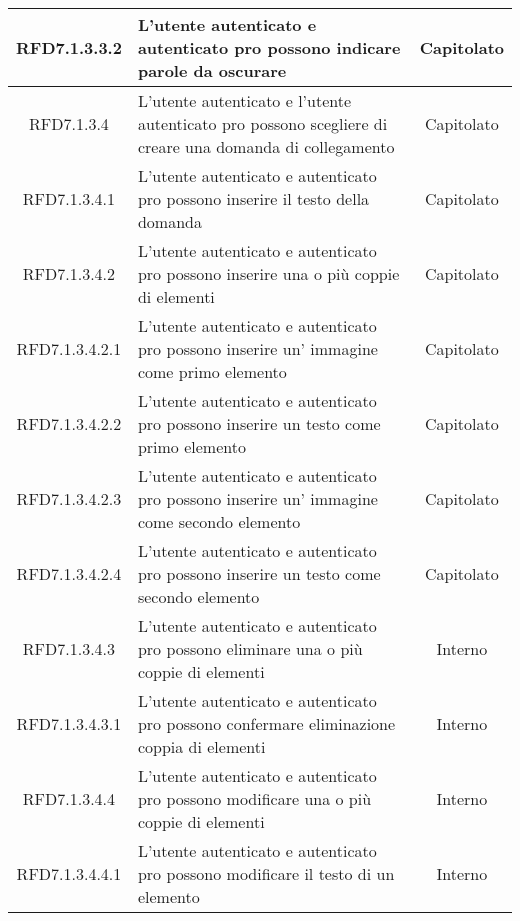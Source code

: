 \begin{longtable}{|c|>{\centering}m{7cm}|c|}
\hypertarget{RFD7.1.3.3.2}{RFD7.1.3.3.2} & L’utente autenticato e autenticato pro possono indicare parole da oscurare & Capitolato
\\ \hline

\hypertarget{RFD7.1.3.4}{RFD7.1.3.4} & L’utente autenticato e l’utente autenticato pro possono scegliere di creare una domanda di collegamento & Capitolato
\\ \hline

\hypertarget{RFD7.1.3.4.1}{RFD7.1.3.4.1} & L’utente autenticato e autenticato pro possono inserire il testo della domanda & Capitolato
\\ \hline

\hypertarget{RFD7.1.3.4.2}{RFD7.1.3.4.2} & L’utente autenticato e autenticato pro possono inserire una o più coppie di elementi & Capitolato
\\ \hline

\hypertarget{RFD7.1.3.4.2.1}{RFD7.1.3.4.2.1} & L’utente autenticato e autenticato pro possono inserire un’ immagine come primo elemento & Capitolato
\\ \hline

\hypertarget{RFD7.1.3.4.2.2}{RFD7.1.3.4.2.2} & L’utente autenticato e autenticato pro possono inserire un testo come primo elemento & Capitolato
\\ \hline

\hypertarget{RFD7.1.3.4.2.3}{RFD7.1.3.4.2.3} & L’utente autenticato e autenticato pro possono inserire un’ immagine come secondo elemento & Capitolato
\\ \hline

\hypertarget{RFD7.1.3.4.2.4}{RFD7.1.3.4.2.4} & L’utente autenticato e autenticato pro possono inserire un testo come secondo elemento & Capitolato
\\ \hline

\hypertarget{RFD7.1.3.4.3}{RFD7.1.3.4.3} & L’utente autenticato e autenticato pro possono eliminare una o più coppie di elementi  & Interno
\\ \hline

\hypertarget{RFD7.1.3.4.3.1}{RFD7.1.3.4.3.1} & L’utente autenticato e autenticato pro possono confermare eliminazione coppia di elementi & Interno
\\ \hline

\hypertarget{RFD7.1.3.4.4}{RFD7.1.3.4.4} & L’utente autenticato e autenticato pro possono modificare una o più coppie di elementi & Interno
\\ \hline

\hypertarget{RFD7.1.3.4.4.1}{RFD7.1.3.4.4.1} & L’utente autenticato e autenticato pro possono modificare il testo di un elemento & Interno
\\ \hline


\end{longtable}
